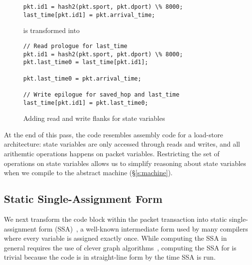 \begin{figure}
\begin{tiny}
\begin{lstlisting}
pkt.id1 = hash2(pkt.sport, pkt.dport) \% 8000;
last_time[pkt.id1] = pkt.arrival_time;
\end{lstlisting}
\end{tiny}
\begin{center}
is transformed into
\end{center}
\begin{tiny}
\begin{lstlisting}
// Read prologue for last_time
pkt.id1 = hash2(pkt.sport, pkt.dport) \% 8000;
pkt.last_time0 = last_time[pkt.id1];

pkt.last_time0 = pkt.arrival_time;

// Write epilogue for saved_hop and last_time
last_time[pkt.id1] = pkt.last_time0;
\end{lstlisting}
\end{tiny}
\caption{Adding read and write flanks for state variables}
\label{fig:stateful_flanks}
\end{figure}

At the end of this pass, the code resembles assembly code for a load-store
architecture: state variables are only accessed through reads and writes, and
all arithemtic operations happens on packet variables. Restricting the set of
operations on state variables allows us to simplify reasoning about state
variables when we compile \pktlanguage to the abstract machine
(\S\ref{s:machine}).


\subsection{Static Single-Assignment Form}
We next transform the code block within the packet transaction into static
single-assignment form (SSA)~\cite{ferrante_ssa}, a well-known intermediate
form used by many compilers where every variable is assigned exactly once.
While computing the SSA in general requires the use of clever graph
algorithms~\cite{post_dominators}, computing the SSA for \pktlanguage is
trivial because the code is in straight-line form by the time SSA is run.


